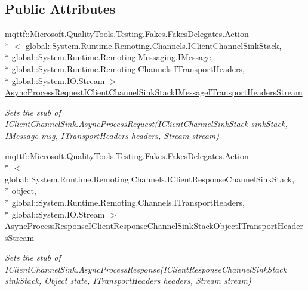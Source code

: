 \subsection*{Public Attributes}
\begin{DoxyCompactItemize}
\item 
mqttf\-::\-Microsoft.\-Quality\-Tools.\-Testing.\-Fakes.\-Fakes\-Delegates.\-Action\\*
$<$ global\-::\-System.\-Runtime.\-Remoting.\-Channels.\-I\-Client\-Channel\-Sink\-Stack, \\*
global\-::\-System.\-Runtime.\-Remoting.\-Messaging.\-I\-Message, \\*
global\-::\-System.\-Runtime.\-Remoting.\-Channels.\-I\-Transport\-Headers, \\*
global\-::\-System.\-I\-O.\-Stream $>$ \hyperlink{class_system_1_1_runtime_1_1_remoting_1_1_channels_1_1_fakes_1_1_stub_i_client_channel_sink_a63eb06c5683a37314ca4a806de0edccb}{Async\-Process\-Request\-I\-Client\-Channel\-Sink\-Stack\-I\-Message\-I\-Transport\-Headers\-Stream}
\begin{DoxyCompactList}\small\item\em Sets the stub of I\-Client\-Channel\-Sink.\-Async\-Process\-Request(\-I\-Client\-Channel\-Sink\-Stack sink\-Stack, I\-Message msg, I\-Transport\-Headers headers, Stream stream)\end{DoxyCompactList}\item 
mqttf\-::\-Microsoft.\-Quality\-Tools.\-Testing.\-Fakes.\-Fakes\-Delegates.\-Action\\*
$<$ global\-::\-System.\-Runtime.\-Remoting.\-Channels.\-I\-Client\-Response\-Channel\-Sink\-Stack, \\*
object, \\*
global\-::\-System.\-Runtime.\-Remoting.\-Channels.\-I\-Transport\-Headers, \\*
global\-::\-System.\-I\-O.\-Stream $>$ \hyperlink{class_system_1_1_runtime_1_1_remoting_1_1_channels_1_1_fakes_1_1_stub_i_client_channel_sink_a4a47940d0862727c6eaf1b810406d086}{Async\-Process\-Response\-I\-Client\-Response\-Channel\-Sink\-Stack\-Object\-I\-Transport\-Headers\-Stream}
\begin{DoxyCompactList}\small\item\em Sets the stub of I\-Client\-Channel\-Sink.\-Async\-Process\-Response(\-I\-Client\-Response\-Channel\-Sink\-Stack sink\-Stack, Object state, I\-Transport\-Headers headers, Stream stream)\end{DoxyCompactList}\item 

\end{DoxyCompactItemize}
